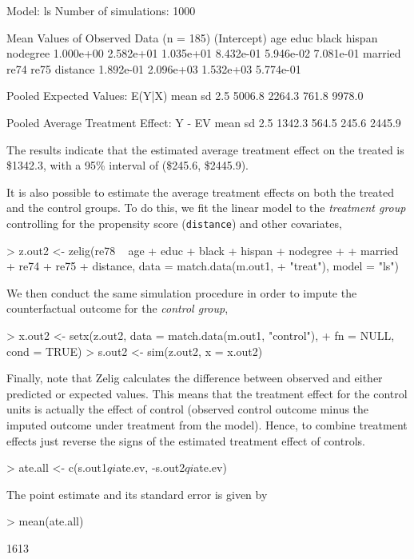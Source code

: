 \begin{enumerate}
\begin{Schunk}
\begin{Soutput}
  Model: ls 
  Number of simulations: 1000 

Mean Values of Observed Data (n = 185) 
(Intercept)         age        educ       black      hispan    nodegree 
  1.000e+00   2.582e+01   1.035e+01   8.432e-01   5.946e-02   7.081e-01 
    married        re74        re75    distance 
  1.892e-01   2.096e+03   1.532e+03   5.774e-01 

Pooled Expected Values: E(Y|X)
  mean     sd   2.5%  97.5% 
5006.8 2264.3  761.8 9978.0 

Pooled Average Treatment Effect: Y - EV
  mean     sd   2.5%  97.5% 
1342.3  564.5  245.6 2445.9 

\end{Soutput}
\end{Schunk}
The results indicate that the estimated average treatment effect on
the treated is 
\$1342.3,
with a 95\% interval of
(\$245.6,
\$2445.9).

It is also possible to estimate the average treatment effects on both
the treated and the control groups. To do this, we fit the linear
model to the {\it treatment group} controlling for the propensity
score ({\tt distance}) and other covariates,
\begin{Schunk}
\begin{Sinput}
> z.out2 <- zelig(re78 ~ age + educ + black + hispan + nodegree + 
+     married + re74 + re75 + distance, data = match.data(m.out1, 
+     "treat"), model = "ls")
\end{Sinput}
\end{Schunk}
We then conduct the same simulation procedure in order to impute the
counterfactual outcome for the {\it control group},
\begin{Schunk}
\begin{Sinput}
> x.out2 <- setx(z.out2, data = match.data(m.out1, "control"), 
+     fn = NULL, cond = TRUE)
> s.out2 <- sim(z.out2, x = x.out2)
\end{Sinput}
\end{Schunk}
Finally, note that Zelig calculates the difference between observed
and either predicted or expected values.  This means that the
treatment effect for the control units is actually the effect of
control (observed control outcome minus the imputed outcome under
treatment from the model).  Hence, to combine treatment effects just
reverse the signs of the estimated treatment effect of controls.
\begin{Schunk}
\begin{Sinput}
> ate.all <- c(s.out1$qi$ate.ev, -s.out2$qi$ate.ev)
\end{Sinput}
\end{Schunk}
The point estimate and its standard error is given by
\begin{Schunk}
\begin{Sinput}
> mean(ate.all)
\end{Sinput}
\begin{Soutput}
[1] 1613


\end{Soutput}
\end{Schunk}
\end{enumerate}
